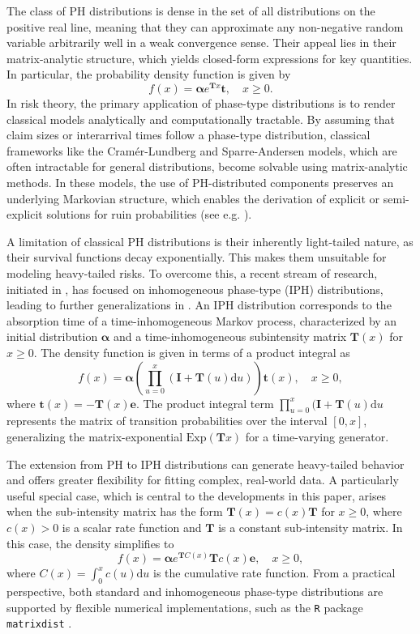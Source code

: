 \documentclass[11pt]{article}
\numberwithin{table}{section}
\numberwithin{figure}{section}
\numberwithin{equation}{section}
\newcommand{\dd}{\mathrm{d}}
\newcommand{\1}{{\mathbf 1}}
\newcommand{\0}{\mat{0}}
\begin{document}
The class of PH distributions is dense in the set of all distributions on the positive real line, meaning that they can approximate any non-negative random variable arbitrarily well in a weak convergence sense. Their appeal lies in their matrix-analytic structure, which yields closed-form expressions for key quantities. In particular, the probability density function is given by
\[
f(x) = \bm{\alpha} e^{\bm{T}x} \bm{t}, \quad x \geq 0.
\]
In risk theory, the primary application of phase-type distributions is to render classical models analytically and computationally tractable. By assuming that claim sizes or interarrival times follow a phase-type distribution, classical frameworks like the Cramér-Lundberg and Sparre-Andersen models, which are often intractable for general distributions, become solvable using matrix-analytic methods. In these models, the use of PH-distributed components preserves an underlying Markovian structure, which enables the derivation of explicit or semi-explicit solutions for ruin probabilities (see e.g. \cite{asmussen2010ruin}).

A limitation of classical PH distributions is their inherently light-tailed nature, as their survival functions decay exponentially. This makes them unsuitable for modeling heavy-tailed risks. To overcome this, a recent stream of research, initiated in \cite{albrecher2018ph}, has focused on inhomogeneous phase-type (IPH) distributions, leading to further generalizations in \cite{bladt2022heavy}. An IPH distribution corresponds to the absorption time of a time-inhomogeneous Markov process, characterized by an initial distribution \(\bm{\alpha}\) and a time-inhomogeneous subintensity matrix \(\bm{T}(x)\) for $x\ge 0$. The density function is given in terms of a product integral as
\[
f(x) = \bm{\alpha} \left( \prod_{u=0}^x (\bm{I} + \bm{T}(u)\dd u) \right) \bm{t}(x),\quad x \geq 0,
\]
where \(\bm{t}(x) = -\bm{T}(x)\bm{e}\). The product integral term $\prod_{u=0}^x (\bm{I} + \bm{T}(u)\dd u$ represents the matrix of transition probabilities over the interval \([0,x]\), generalizing the matrix-exponential \(\mbox{Exp}(\bm{T}x)\) for a time-varying generator.

The extension from PH to IPH distributions can generate heavy-tailed behavior and offers greater flexibility for fitting complex, real-world data. A particularly useful special case, which is central to the developments in this paper, arises when the sub-intensity matrix has the form \(\bm{T}(x) = c(x)\bm{T}\) for $x\ge 0$, where \(c(x)>0\) is a scalar rate function and \(\bm{T}\) is a constant sub-intensity matrix. In this case, the density simplifies to
\[
f(x) = \bm{\alpha} e^{\bm{T}C(x)} \bm{T} c(x) \bm{e},\quad x \geq 0,
\]
where \(C(x) = \int_0^x c(u) \dd u\) is the cumulative rate function. From a practical perspective, both standard and inhomogeneous phase-type distributions are supported by flexible numerical implementations, such as the \texttt{R} package \texttt{matrixdist} \cite{bladt2021matrixdist}.
\end{document}
